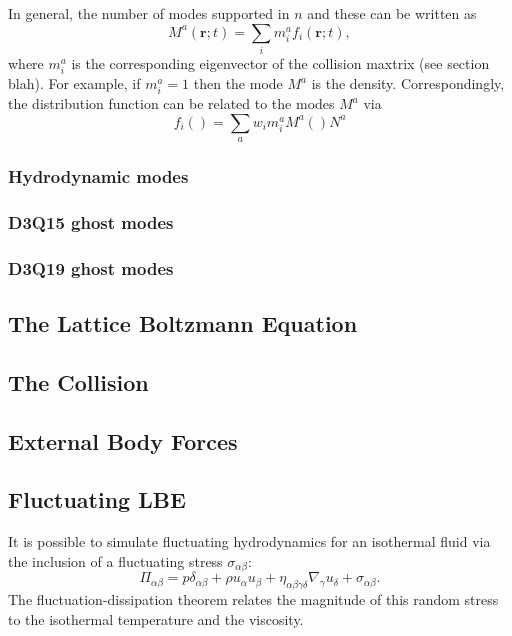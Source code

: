 In general, the number of modes supported in $n$ and these can
be written as
\begin{equation}
M^a(\mathbf{r};t) = \sum_i m_i^a f_i(\mathbf{r};t),
\end{equation}
where $m_i^a$ is the corresponding eigenvector of the collision
maxtrix (see section blah). For example, if $m_i^a = 1$ then the
mode $M^a$ is the density. Correspondingly, the distribution
function can be related to the modes $M^a$ via
\begin{equation}
f_i() = \sum_a w_i m_i^a M^a() N^a
\end{equation}

\subsubsection{Hydrodynamic modes}

\subsubsection{D3Q15 ghost modes}

\subsubsection{D3Q19 ghost modes}

\subsection{The Lattice Boltzmann Equation}

\subsection{The Collision}

\subsection{External Body Forces}

\subsection{Fluctuating LBE}

It is possible \cite{adhikari2005} to simulate fluctuating
hydrodynamics for an isothermal fluid via the inclusion of
a fluctuating stress $\sigma_{\alpha\beta}$:
\begin{equation}
\Pi_{\alpha\beta} = p\delta_{\alpha\beta} + \rho u_\alpha u_\beta
+ \eta_{\alpha\beta\gamma\delta} \nabla_\gamma u_\delta + \sigma_{\alpha\beta}.
\end{equation}
The fluctuation-dissipation theorem relates the magnitude of this
random stress to the isothermal temperature and the viscosity.

